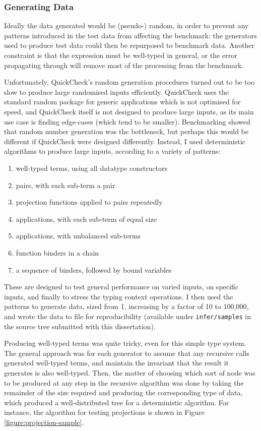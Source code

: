 \subsubsection{Generating Data}
Ideally the data generated would be (pseudo-) random, in order to prevent any patterns introduced in the test data from affecting the benchmark: the generators used to produce test data could then be repurposed to benchmark data.
Another constraint is that the expression must be well-typed in general, or the error propagating through will remove most of the processing from the benchmark.

Unfortunately, QuickCheck's random generation procedures turned out to be too slow to produce large randomised inputs efficiently.
QuickCheck uses the standard random package for generic applications which is not optimised for speed, and QuickCheck itself is not designed to produce large inputs, as its main use case is finding edge-cases (which tend to be smaller).
Benchmarking showed that random number generation was the bottleneck, but perhaps this would be different if QuickCheck were designed differently.
Instead, I used deterministic algorithms to produce large inputs, according to a variety of patterns:
\begin{enumerate}
\item well-typed terms, using all datatype constructors
\item pairs, with each sub-term a pair
\item projection functions applied to pairs repeatedly
\item applications, with each sub-term of equal size
\item applications, with unbalanced sub-terms
\item function binders in a chain
\item a sequence of binders, followed by bound variables
\end{enumerate}
These are designed to test general performance on varied inputs, on specific inputs, and finally to stress the typing context operations.
I then used the patterns to generate data, sized from 1, increasing by a factor of 10 to 100,000, and wrote the data to file for reproducibility (available under \texttt{infer/samples} in the source tree submitted with this dissertation).

Producing well-typed terms was quite tricky, even for this simple type system.
The general approach was for each generator to assume that any recursive calls generated well-typed terms, and maintain the invariant that the result it generates is also well-typed.
Then, the matter of choosing which sort of node was to be produced at any step in the recursive algorithm was done by taking the remainder of the size required and producing the corresponding type of data, which produced a well-distributed tree for a deterministic algorithm.
For instance, the algorithm for testing projections is shown in Figure \ref{figure:projection-sample}.

